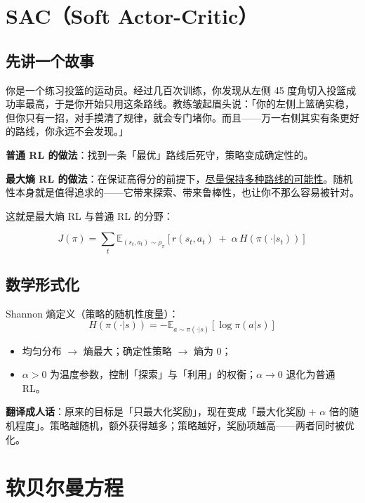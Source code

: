 \documentclass{article}
\begin{document}
\section*{SAC（Soft Actor-Critic）}

\subsection*{先讲一个故事}

你是一个练习投篮的运动员。经过几百次训练，你发现从左侧 45 度角切入投篮成功率最高，于是你开始只用这条路线。教练皱起眉头说：「你的左侧上篮确实稳，但你只有一招，对手摸清了规律，就会专门堵你。而且——万一右侧其实有条更好的路线，你永远不会发现。」

\textbf{普通 RL 的做法}：找到一条「最优」路线后死守，策略变成确定性的。

\textbf{最大熵 RL 的做法}：在保证高得分的前提下，\underline{尽量保持多种路线的可能性}。随机性本身就是值得追求的——它带来探索、带来鲁棒性，也让你不那么容易被针对。

这就是最大熵 RL 与普通 RL 的分野：

\[
\boxed{J(\pi) = \sum_t \mathbb{E}_{(s_t,a_t)\sim\rho_\pi}\!\left[r(s_t,a_t) \;+\; \alpha\,H\!\left(\pi(\cdot|s_t)\right)\right]}
\]

\subsection*{数学形式化}

Shannon 熵定义（策略的随机性度量）：
\[
H(\pi(\cdot|s)) = -\mathbb{E}_{a\sim\pi(\cdot|s)}\!\left[\log\pi(a|s)\right]
\]

\begin{itemize}
  \item 均匀分布 $\to$ 熵最大；确定性策略 $\to$ 熵为 $0$；
  \item $\alpha > 0$ 为温度参数，控制「探索」与「利用」的权衡；$\alpha \to 0$ 退化为普通 RL。
\end{itemize}

\textbf{翻译成人话}：原来的目标是「只最大化奖励」，现在变成「最大化奖励 $+$ $\alpha$ 倍的随机程度」。策略越随机，额外获得越多；策略越好，奖励项越高——两者同时被优化。

\section*{软贝尔曼方程}
\end{document}
